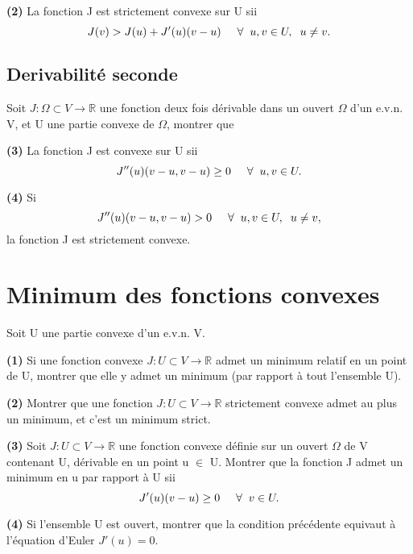 \documentclass[11pt, a4paper]{article}
\newcommand{\mq}{montrer que }
\newcommand{\Mq}{Montrer que }
\begin{document}
\textbf{(2)} La fonction J est strictement convexe sur U sii $$ J(v) >  J(u) + J'(u)(v-u) \hspace{5mm} \forall \hspace{2mm} u,v \in U, \hspace{2mm} u\neq v.$$

\subsection{Derivabilité seconde}

Soit $J:\Omega \subset V \rightarrow \mathbb{R}$ une fonction deux fois dérivable dans un ouvert $\Omega$ d'un e.v.n. V, et U une partie convexe de $\Omega$, \mq

\textbf{(3)} La fonction J est convexe sur U sii $$ J''(u)(v-u,v-u) \geq 0 \hspace{5mm} \forall \hspace{2mm} u,v \in U.$$

\textbf{(4)} Si $$ J''(u)(v-u,v-u) > 0 \hspace{5mm} \forall \hspace{2mm} u,v \in U, \hspace{2mm} u\neq v,$$ la fonction J est strictement convexe.

\medskip
\section{Minimum des fonctions convexes}
Soit U une partie convexe d'un e.v.n. V.

\textbf{(1)} Si une fonction convexe $J: U \subset V \rightarrow \mathbb{R}$ admet un minimum relatif en un point de U, \mq elle y admet un minimum (par rapport à tout l'ensemble U).

\textbf{(2)} \Mq une fonction $J: U \subset V \rightarrow \mathbb{R}$ strictement convexe admet au plus un minimum, et c'est un minimum strict.

\textbf{(3)} Soit $J: U \subset V \rightarrow \mathbb{R}$ une fonction convexe définie sur un ouvert $\Omega$ de V contenant U, dérivable en un point u $\in$ U. \Mq la fonction J admet un minimum en u par rapport à U sii $$ J'(u)(v-u) \geq 0 \hspace{5mm} \forall \hspace{2mm} v\in U.$$

\textbf{(4)} Si l'ensemble U est ouvert, \mq la condition précédente equivaut à l'équation d'Euler $J'(u)=0.$
\end{document}
